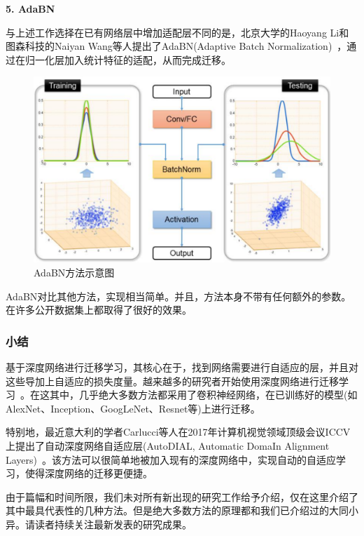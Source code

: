 \textbf{5. AdaBN}

与上述工作选择在已有网络层中增加适配层不同的是，北京大学的Haoyang Li和图森科技的Naiyan Wang等人提出了AdaBN(Adaptive Batch Normalization)~\cite{li2018adaptive}，通过在归一化层加入统计特征的适配，从而完成迁移。

\begin{figure}[htbp]
	\centering
	\includegraphics[scale=0.38]{./figures/fig-deep-adabn.pdf}
	\caption{AdaBN方法示意图}
	\label{fig-deep-adabn}
\end{figure}

AdaBN对比其他方法，实现相当简单。并且，方法本身不带有任何额外的参数。在许多公开数据集上都取得了很好的效果。

\subsubsection{小结}

基于深度网络进行迁移学习，其核心在于，找到网络需要进行自适应的层，并且对这些导加上自适应的损失度量。越来越多的研究者开始使用深度网络进行迁移学习~\cite{long2016deep,zhuo2017deep,zhuang2015supervised,sun2016deep,wei2016deep,luo2017label}。在这其中，几乎绝大多数方法都采用了卷积神经网络，在已训练好的模型(如AlexNet、Inception、GoogLeNet、Resnet等)上进行迁移。

特别地，最近意大利的学者Carlucci等人在2017年计算机视觉领域顶级会议ICCV上提出了自动深度网络自适应层(AutoDIAL, Automatic DomaIn Alignment Layers)~\cite{carlucci2017autodial}。该方法可以很简单地被加入现有的深度网络中，实现自动的自适应学习，使得深度网络的迁移更便捷。

由于篇幅和时间所限，我们未对所有新出现的研究工作给予介绍，仅在这里介绍了其中最具代表性的几种方法。但是绝大多数方法的原理都和我们已介绍过的大同小异。请读者持续关注最新发表的研究成果。

